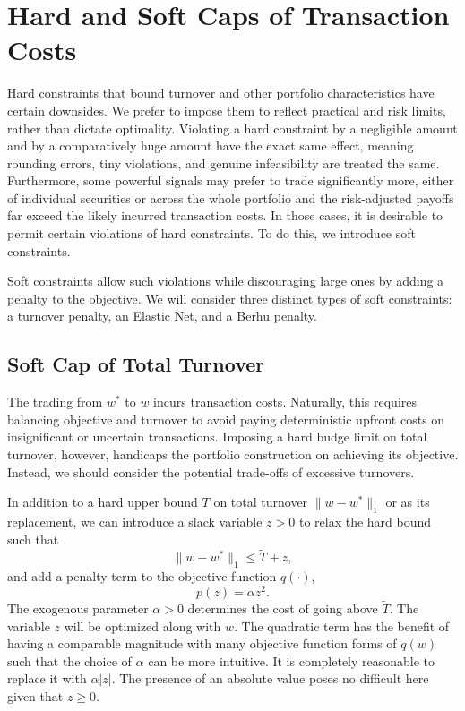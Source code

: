\documentclass[11pt, letterpaper]{article}
\begin{document}
\section{Hard and Soft Caps of Transaction Costs}
\label{additional_gating}

Hard constraints that bound turnover and other portfolio characteristics have certain downsides. We prefer to impose them to
reflect practical and risk limits, rather than dictate optimality. Violating a hard constraint by a negligible amount and by a
comparatively huge amount have the exact same effect, meaning rounding errors, tiny violations, and genuine infeasibility are
treated the same. Furthermore, some powerful signals may prefer to trade significantly more, either of individual securities or
across the whole portfolio and the risk-adjusted payoffs far exceed the likely incurred transaction costs. In those cases, it is
desirable to permit certain violations of hard constraints. To do this, we introduce soft constraints.

Soft constraints allow such violations while discouraging large ones by adding a penalty to the objective. We will consider three
distinct types of soft constraints: a turnover penalty, an Elastic Net, and a Berhu penalty.

\subsection{Soft Cap of Total Turnover}
The trading from $w^*$ to $w$ incurs transaction costs. Naturally, this requires balancing objective and turnover to avoid
paying deterministic upfront costs on insignificant or uncertain transactions. Imposing a hard budge limit on total turnover,
however, handicaps the portfolio construction on achieving its objective. Instead, we should consider the potential trade-offs
of excessive turnovers.

In addition to a hard upper bound $T$ on total turnover $\lVert w - w^*\rVert_1$ or as its replacement, we can introduce a slack
variable $z > 0$ to relax the hard bound such that
\begin{equation*}
	\lVert w - w^*\rVert_1 \leq \tilde{T} + z,
\end{equation*}
and add a penalty term to the objective function $q(\cdot)$,
\begin{equation}\label{eq:tvr-total}
	p(z) = \alpha z^2.
\end{equation}
The exogenous parameter $\alpha > 0$ determines the cost of going above $\tilde{T}$. The variable $z$ will be optimized along
with $w$. The quadratic term has the benefit of having a comparable magnitude with many objective function forms of $q(w)$ such
that the choice of $\alpha$ can be more intuitive. It is completely reasonable to replace it with $\alpha |z|$. The presence of
an absolute value poses no difficult here given that $z \geq 0$.
\end{document}
